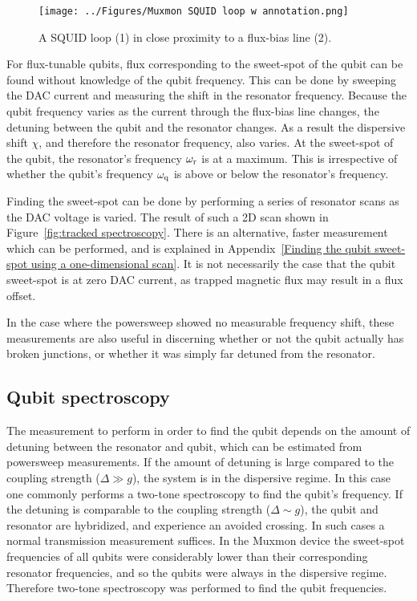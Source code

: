        \begin{figure}
          \begin{center}
          \vspace{-30pt}
            \texttt{[image: ../Figures/Muxmon SQUID loop w annotation.png]}
          \end{center}
          \vspace{-20 pt}
          \caption{A SQUID loop (1) in close proximity to a flux-bias line (2).}
          \label{fig:SQUID loop}
        \end{figure}
        For flux-tunable qubits, flux corresponding to the sweet-spot of the qubit can be found without knowledge of the qubit frequency. This can be done by sweeping the DAC current and measuring the shift in the resonator frequency. Because the qubit frequency varies as the current through the flux-bias line changes, the detuning between the qubit and the resonator changes. As a result the dispersive shift $\chi$, and therefore the resonator frequency, also varies. At the sweet-spot of the qubit, the resonator's frequency $\omega_\text{r}$ is at a maximum. This is irrespective of whether the qubit's frequency $\omega_\text{q}$ is above or below the resonator's frequency.

        Finding the sweet-spot can be done by performing a series of resonator scans as the DAC voltage is varied. The result of such a 2D scan shown in Figure~\ref{fig:tracked spectroscopy}. There is an alternative, faster measurement which can be performed, and is explained in Appendix~\ref{Finding the qubit sweet-spot using a one-dimensional scan}. It is not necessarily the case that the qubit sweet-spot is at zero DAC current, as trapped magnetic flux may result in a flux offset.

        In the case where the powersweep showed no measurable frequency shift, these measurements are also useful in discerning whether or not the qubit actually has broken junctions, or whether it was simply far detuned from the resonator.

      \subsection{Qubit spectroscopy}
        \label{sec:spectroscopy}

        The measurement to perform in order to find the qubit depends on the amount of detuning between the resonator and qubit, which can be estimated from powersweep measurements. If the amount of detuning is large compared to the coupling strength ($\Delta \gg  g$), the system is in the dispersive regime. In this case one commonly performs a two-tone spectroscopy to find the qubit's frequency. If the detuning is comparable to the coupling strength ($\Delta \sim g$), the qubit and resonator are hybridized, and experience an avoided crossing. In such cases a normal transmission measurement suffices. In the Muxmon device the sweet-spot frequencies of all qubits were considerably lower than their corresponding resonator frequencies, and so the qubits were always in the dispersive regime. Therefore two-tone spectroscopy was performed to find the qubit frequencies.

